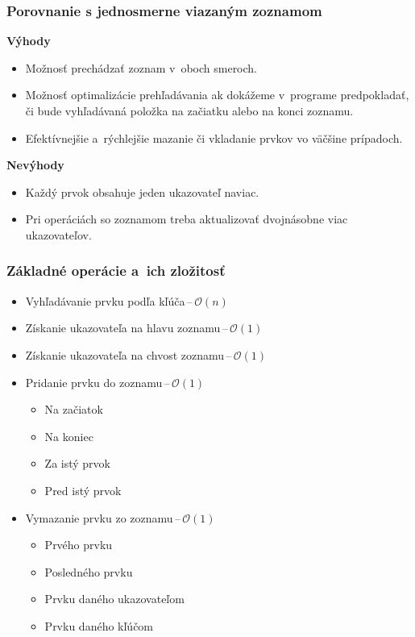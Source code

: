 \documentclass{beamer}
\begin{document}
  \begin{frame}
    \frametitle{Porovnanie s jednosmerne viazaným zoznamom}
    \textbf{Výhody}
    \begin{itemize}
      \item Možnosť prechádzať zoznam v~oboch smeroch.
      \item Možnosť optimalizácie prehľadávania ak dokážeme v~programe 
        predpokladať, či bude vyhľadávaná položka na začiatku alebo na konci 
        zoznamu.
      \item Efektívnejšie a~rýchlejšie mazanie či vkladanie prvkov vo väčšine 
        prípadoch.
    \end{itemize}
    \pause
    \textbf{Nevýhody}
    \begin{itemize}
      \item Každý prvok obsahuje jeden ukazovateľ naviac.
      \item Pri operáciách so zoznamom treba aktualizovať dvojnásobne viac
        ukazovateľov.
    \end{itemize}
  \end{frame}

  \begin{frame}
    \frametitle{Základné operácie a~ich zložitosť}
    \begin{itemize}
      \item Vyhľadávanie prvku podľa kľúča\,--\,$\mathcal{O}(n)$
      \item Získanie ukazovateľa na hlavu zoznamu\,--\,$\mathcal{O}(1)$
      \item Získanie ukazovateľa na chvost zoznamu\,--\,$\mathcal{O}(1)$
      \item Pridanie prvku do zoznamu\,--\,$\mathcal{O}(1)$
        \begin{itemize}
          \item Na začiatok
          \item Na koniec
          \item Za istý prvok
          \item Pred istý prvok
        \end{itemize}
      \item Vymazanie prvku zo zoznamu\,--\,$\mathcal{O}(1)$
        \begin{itemize}
          \item Prvého prvku
          \item Posledného prvku
          \item Prvku daného ukazovateľom
          \item Prvku daného kľúčom
        \end{itemize}
    \end{itemize}
  \end{frame}
\end{document}
